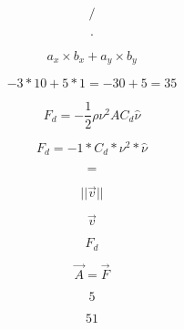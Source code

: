 \documentclass[12pt, a4paper]{article}
\begin{document}
\begin{equation}
\label{div}
/
\end{equation}

\begin{equation}
\label{dot}
\cdot
\end{equation}

\begin{equation}
\label{dotform}
a_x\times b_x + a_y\times b_y
\end{equation}

\begin{equation}
\label{dotresult}
-3 * 10 + 5 * 1 = -30 + 5 = 35
\end{equation}

\begin{equation}
\label{drag1}
F_d = - \frac{1}{2}\rho\nu^2 A C_d\hat{\nu}
\end{equation}

\begin{equation}
\label{drag2}
F_d = - 1 * C_d * \nu^2 * \hat{\nu}
\end{equation}

\begin{equation}
\label{equals}
=
\end{equation}

\begin{equation}
\label{escmagvectorv}
||\vec{v}||
\end{equation}

\begin{equation}
\label{escvectorv}
\vec{v}
\end{equation}

\begin{equation}
\label{Fd}
F_d
\end{equation}

\begin{equation}
\label{fequalsa}
\vec{A} = \vec{F}
\end{equation}

\begin{equation}
\label{five}
5
\end{equation}

\begin{equation}
\label{fiveone}
51
\end{equation}
\end{document}
